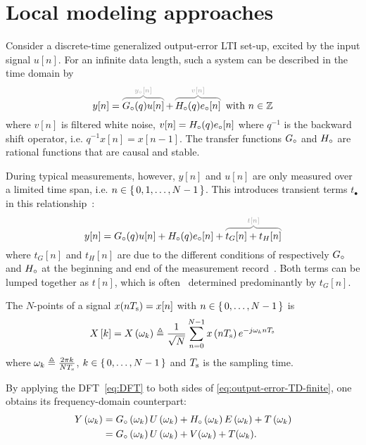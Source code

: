 \section{Local modeling approaches}
\label{sec:theory}

Consider a discrete-time generalized output-error \gls{LTI} set-up, excited by the input signal $u[n]$.
For an infinite data length, such a system can be described in the time domain by
\begin{equation}
  y[n] = \ezbrace{\true{G}(q) u[n]}{\true{y}[n]} + \ezbrace{\true{H}(q) \true{e}[n]}{v[n]} \text{ with } n \in \IntegerNumbers
  \label{eq:output-error-TD-infinite}
\end{equation}
where $v[n]$ is filtered white noise, $v[n] = {H}_{\circ}(q) {e}_{\circ}[n]$ where $q^{-1}$ is the backward shift operator, i.e. $q^ {-1}x[n] = x[n-1]$.
The transfer functions ${G}_{\circ}$ and ${H}_{\circ}$ are rational functions that are causal and stable.

During typical measurements, however, $y[n]$ and $u[n]$ are only measured over a limited time span, i.e. $n \in \set{0,1,\ldots,N-1}$.
This introduces transient terms $t_{\bullet}$ in this relationship~\citep{Pintelon1997ARB}:
\begin{equation}
y[n] = \true{G}(q) u[n] + \true{H}(q) \true{e}[n] + \ezbrace{t_G[n] + t_H[n]}{t[n]}
\label{eq:output-error-TD-finite}
\end{equation}
where $t_G[n]$ and $t_H[n]$ are due to the different conditions of respectively ${G}_{\circ}$ and ${H}_{\circ}$ at the beginning and end of the measurement record~\citep{Pintelon1997ARB}.
Both terms can be lumped together as $t[n]$, which is often~\citep{Pintelon2010LPM1} determined predominantly by $t_G[n]$.

\begin{definition}\label{def:DFT}
The $N$-points  of a signal $x(nT_{\mathrm{s}}) = x[n]$ with $n \in \set{0,\ldots,N-1}$ is
\begin{equation}
  X \left[ k \right] =
  X \left( \omega_k \right)
  \triangleq
  \frac{1}{\sqrt{N}}\sum_{n=0}^{N-1} x \left( n T_{\mathrm{s}} \right)  e^{- j \omega_k n T_{\mathrm{s}} }
  \label{eq:DFT}
\end{equation}
where $\omega_k \triangleq \tfrac{2 \pi k }{N T_{\mathrm{s}}}$, $k \in \set{0,\ldots,N-1}$ and $T_{\mathrm{s}}$ is the sampling time.
\end{definition}

By applying the \gls{DFT}~\eqref{eq:DFT} to both sides of \eqref{eq:output-error-TD-finite}, one obtains its frequency-domain counterpart:
\begin{align}
    Y \left( \omega_k \right) 
    & = {G}_{\circ} \left( \omega_k \right) U \left( \omega_k \right) 
      + {H}_{\circ} \left( \omega_k \right) E \left( \omega_k \right)
      + T \left( \omega_k \right)\\
      &= {G}_{\circ} \left( \omega_k \right) U \left( \omega_k \right)  + V(\omega_k) + T(\omega_k)
      \text{.}
  \label{eq:output-error-FD}
\end{align}

